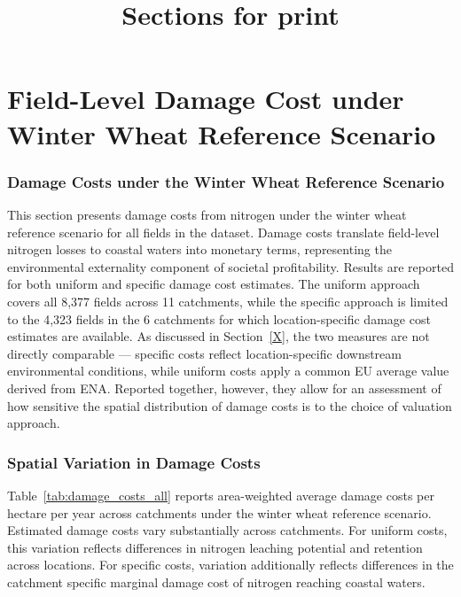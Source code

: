 \documentclass[12pt]{article}
\title{\textbf{Sections for print}}
\begin{document}
 
\section{Field-Level Damage Cost under Winter Wheat Reference Scenario} 

\subsubsection{Damage Costs under the Winter Wheat Reference Scenario} 

This section presents damage costs from nitrogen under the winter wheat reference scenario for all fields in the dataset. Damage costs translate field-level nitrogen losses to coastal waters into monetary terms, representing the environmental externality component of societal profitability. Results are reported for both uniform and specific damage cost estimates. The uniform approach covers all 8,377 fields across 11 catchments, while the specific approach is limited to the 4,323 fields in the 6 catchments for which location-specific damage cost estimates are available. As discussed in Section~\ref{X}, the two measures are not directly comparable --- specific costs reflect location-specific downstream environmental conditions, while uniform costs apply a common EU average value derived from ENA. Reported together, however, they allow for an assessment of how sensitive the spatial distribution of damage costs is to the choice of valuation approach.

\subsubsection{Spatial Variation in Damage Costs} 

Table~\ref{tab:damage_costs_all} reports area-weighted average damage costs per hectare per year across catchments under the winter wheat reference scenario. Estimated damage costs vary substantially across catchments. For uniform costs, this variation reflects differences in nitrogen leaching potential and retention across locations. For specific costs, variation additionally reflects differences in the catchment specific marginal damage cost of nitrogen reaching coastal waters.
\end{document}
